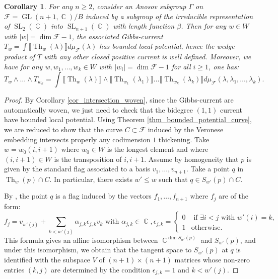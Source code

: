 \documentclass[12pt]{amsbook}%
\newtheorem{cor}[thm]{Corollary}
\theoremstyle{definition}
\theoremstyle{remark}
\numberwithin{section}{chapter}
\numberwithin{subsection}{section}
\numberwithin{figure}{chapter}
\DeclareMathOperator{\C}{\mathbb{C}}
\DeclareMathOperator{\GL}{GL}
\DeclareMathOperator{\SL}{SL}
\DeclareMathOperator{\Th}{Th}
\newcommand\intcur[1]{\llbracket #1 \rrbracket}
\def\cF{{\mathscr{F}}}
\def\la{\lambda}
\def\kap{}
\begin{document}
{{%

\begin{cor} \label{cor_veronese_gen} For any $n\geqslant 2$, consider an  Anosov subgroup $\Gamma$ on $\cF = \GL(n+1,\C)  / B$ induced by a subgroup of the irreducible representation of $\SL_2(\C)$ into $\SL_{n+1}(\C)$ with length function $\beta$. Then for any $w \in W$ with $|w|= \dim \cF -1$, the associated Gibbs-current $T_w = \int \intcur{\Th_w(\lambda)} d\mu_{\cF}(\lambda)$ has bounded local potential, hence the wedge product of $T$ with any other closed positive current is well defined. Moreover, we have for any $w, w_1,\ldots, w_k \in W$ with $|w_i| = \dim \cF -1 $ for all $i\geqslant 1$, one has: 
\begin{equation} \label{eq_wedge_veronese}
T_{w} \wedge \ldots \wedge T_{w_k}  = \int \intcur{\Th_{w}(\lambda)}\wedge \intcur{\Th_{w_1}(\lambda_1)} \ldots \intcur{\Th_{w_k}(\lambda_k)} d\mu_{\cF}(\lambda, \la_1, \ldots, \lambda_k).
\end{equation}
\end{cor}


\begin{proof} By Corollary \ref{cor_intersection_woven}, since the Gibbs-current are automatically woven, we just need to check that the bidegree $(1,1)$ current have bounded local potential.  Using  Theorem \ref{thm_bounded_potential_curve}, we are reduced  to show  that the curve $C \subset \cF$ induced by the Veronese embedding intersects properly  any codimension $1$ thickening. Take $w = w_0 (i, i+1)$ where $w_0 \in W$ is the longest element and where $(i,i+1) \in W$ is the transposition of $i, i+1$. 
Assume by homogeneity that $p $ is given by the standard flag associated to a basis $v_1 ,\ldots , v_{n+1}$.  Take a point $q $ in $\Th_{w}(p) \cap C$. In particular, there exists $w'\leqslant w$ such that $q \in S_{w'}(p) \cap C$. 

   
By \cite[p. 157]{fulton_young}, the point $q$ is a flag induced by the vectors $f_1 ,\ldots, f_{n+1}$ where $f_j$ are of the form: 
\begin{equation} \label{eq_formula_fulton}
f_j = v_{w'(j)} + \sum_{k< w'(j)} \alpha_{j,k} \epsilon_{j,k} v_k \text{ with } \alpha_{j,k} \in \C,  \epsilon_{j,k} = \left \lbrace \begin{array}{ll}
0 & \text{ if } \exists i <j \text{ with } w'(i)=k ,\\
1 & \text{otherwise}. 
\end{array}  \right .
\end{equation} 
This formula gives an affine isomorphism between $\C^{\dim S_{w'}(p)}$ and $S_{w'}(p)$, and under this isomorphism, we obtain that the tangent space to $S_{w'}(p)$ at $q$ is identified with the subspace $V$ of $(n+1)\times (n+1)$ matrices whose non-zero entries $(k,j)$ are determined by the condition $\epsilon_{j,k}=1$ and $k < w'(j)$. 



\end{proof}}}
\end{document}
